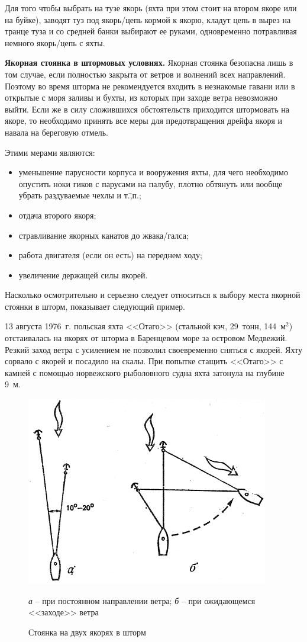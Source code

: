 \documentclass[a4paper, 12pt, twoside, final, book, russian, fittopage, cyremdash]{ncc}
\newcommand{\msq}{~м\ensuremath{^2}\xspace}
\begin{document}
Для того чтобы выбрать на тузе якорь (яхта при этом стоит на втором якоре или на буйке), заводят туз под якорь\-/цепь кормой к якорю, кладут цепь в вырез на транце туза и со средней банки выбирают ее руками, одновременно потравливая немного якорь\-/цепь с яхты.

\textbf{Якорная стоянка в штормовых условиях.} Якорная стоянка безопасна лишь в том случае, если полностью закрыта от ветров и волнений всех направлений. Поэтому во время шторма не рекомендуется входить в незнакомые гавани или в открытые с моря заливы и бухты, из которых при заходе ветра невозможно выйти. Если же в силу сложившихся обстоятельств приходится штормовать на якоре, то необходимо принять все меры для предотвращения дрейфа якоря и навала на береговую отмель. 

Этими мерами являются: 
\begin{itemize}
\item уменьшение парусности корпуса и вооружения яхты, для чего необходимо опустить ноки гиков с парусами на палубу, плотно обтянуть или вообще убрать раздуваемые чехлы и т.\=,п.; 
\item отдача второго якоря; 
\item стравливание якорных канатов до жвака\-/галса; 
\item работа двигателя (если он есть) на переднем ходу; 
\item увеличение держащей силы якорей. 
\end{itemize}

Насколько осмотрительно и серьезно следует относиться к выбору места якорной стоянки в шторм, показывает следующий пример.

{\small 13 августа 1976~г. польская яхта <<Отаго>> (стальной кэч, 29~тонн, 144\msq) отстаивалась на якорях от шторма в Баренцевом море за островом Медвежий. Резкий заход ветра с усилением не позволил своевременно сняться с якорей. Яхту сорвало с якорей и посадило на скалы. При попытке стащить <<Отаго>> с камней с помощью норвежского рыболовного судна яхта затонула на глубине 9~м.}

\begin{figure}[htb]
  \centering{}
  \includegraphics[scale=1.3]{0135P}
  \caption{Стоянка на двух якорях в шторм}
  \label{fig:135}
  \small
  \centering{}
  \textit{а} \--- при постоянном направлении ветра; \textit{б} \--- при ожидающемся <<заходе>> ветра
\end{figure}
\end{document}
